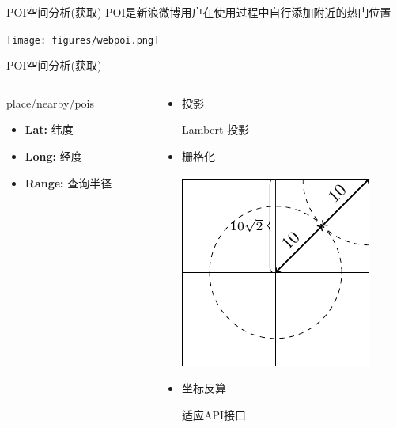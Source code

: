 \begin{frame}[c]{POI空间分析(获取)}
    POI是新浪微博用户在使用过程中自行添加附近的热门位置

    \vspace{1em}
    \texttt{[image: figures/webpoi.png]}
\end{frame}

\begin{frame}[c]{POI空间分析(获取)}
    \begin{columns}
        \begin{column}{0.5 \textwidth}
            \alert{place/nearby/pois}
            \vspace{1em}
            \begin{itemize}
                \item \textbf{Lat:} 纬度
                \item \textbf{Long:} 经度
                \item \textbf{Range:} 查询半径
            \end{itemize}
        \end{column}
        
        \pause
        \begin{column}{0.5 \textwidth}
            \begin{itemize}
                \item \alert{投影}

                Lambert 投影

                \pause
                \item \alert{栅格化}

                \vspace{0.5em}
                \includegraphics[scale=0.8]{figures/query.pdf}

                \pause
                \item \alert{坐标反算}

                适应API接口

            \end{itemize}
            
        \end{column}
    \end{columns}
\end{frame}

